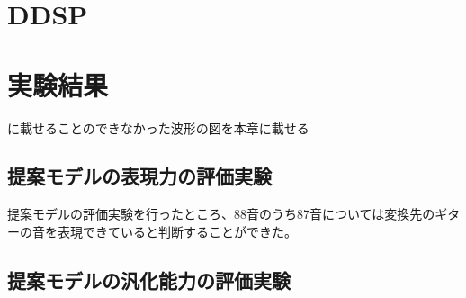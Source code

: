 \chapter{DDSP}
\label{app:DDSP}

\chapter{実験結果}
\label{app:result}

に載せることのできなかった波形の図を本章に載せる

\section{提案モデルの表現力の評価実験}

提案モデルの評価実験を行ったところ、88音のうち87音については変換先のギターの音を表現できていると判断することができた。


\section{提案モデルの汎化能力の評価実験}